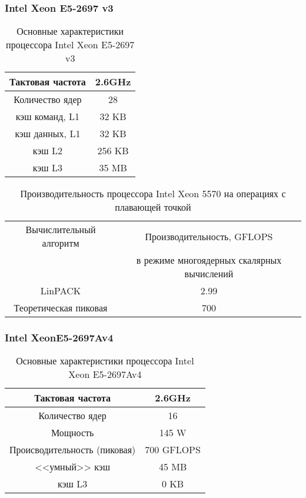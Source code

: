 \subsubsection{Intel Xeon E5-2697 v3}
\begin{table}[ht]
	\begin{center}
		\caption{Основные характеристики процессора Intel Xeon  E5-2697 v3}
		\begin{tabular}{|c|c|}
			\hline	
			Тактовая частота & 2.6GHz   \\ \hline
			Количество ядер & 28 	    \\ \hline
			кэш команд, L1 &  32 KB     \\ \hline
			кэш данных, L1 &  32 KB     \\ \hline
			кэш L2         &  256 KB    \\ \hline
			кэш L3         &  35 MB     \\ \hline
		\end{tabular}
	\end{center} 	
\end{table} 	

\begin{table}[ht]
	\begin{center}
		\caption{Производительность процессора Intel Xeon  5570 на операциях с плавающей точкой}
		\begin{tabular}{|c|c|}
			\hline	
			Вычислительный алгоритм &  Производительность, GFLOPS \\ 
			& в режиме многоядерных скалярных вычислений \\ \hline
		    LinPACK  &  2.99 	\\ \hline
			Теоретическая пиковая &  700   \\ \hline
		\end{tabular}
	\end{center} 	
\end{table} 

\clearpage	

\subsubsection{Intel XeonE5-2697Av4}

\begin{table}[ht]
	\begin{center}
		\caption{Основные характеристики процессора Intel Xeon  E5-2697Av4}
		\begin{tabular}{|c|c|}
			\hline	
			Тактовая частота & 2.6GHz   \\ \hline
			Количество ядер & 16 	     \\ \hline
			Мощность        &  145 W      \\ \hline
			Происводительность (пиковая) &  700 GFLOPS       \\ \hline
			<<умный>> кэш   &  45 MB      \\ \hline
			кэш L3          &  0 KB        \\ \hline
		\end{tabular}
	\end{center} 	
\end{table} 	




